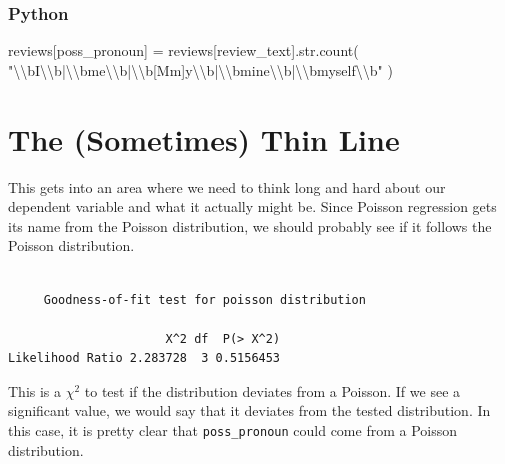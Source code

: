 \documentclass[
  letterpaper,
]{krantz}
\newenvironment{Shaded}{}{}
\newcommand{\BuiltInTok}[1]{\textcolor[rgb]{0.00,0.50,0.00}{#1}}
\newcommand{\CharTok}[1]{\textcolor[rgb]{0.25,0.44,0.63}{#1}}
\newcommand{\NormalTok}[1]{#1}
\newcommand{\OperatorTok}[1]{\textcolor[rgb]{0.40,0.40,0.40}{#1}}
\newcommand{\StringTok}[1]{\textcolor[rgb]{0.25,0.44,0.63}{#1}}
\begin{document}
\subsubsection{Python}

\begin{Shaded}
\begin{Highlighting}[]
\NormalTok{reviews[}\StringTok{\textquotesingle{}poss\_pronoun\textquotesingle{}}\NormalTok{] }\OperatorTok{=}\NormalTok{ reviews[}\StringTok{\textquotesingle{}review\_text\textquotesingle{}}\NormalTok{].}\BuiltInTok{str}\NormalTok{.count(}
  \StringTok{\textquotesingle{}"}\CharTok{\textbackslash{}\textbackslash{}}\StringTok{bI}\CharTok{\textbackslash{}\textbackslash{}}\StringTok{b|}\CharTok{\textbackslash{}\textbackslash{}}\StringTok{bme}\CharTok{\textbackslash{}\textbackslash{}}\StringTok{b|}\CharTok{\textbackslash{}\textbackslash{}}\StringTok{b[Mm]y}\CharTok{\textbackslash{}\textbackslash{}}\StringTok{b|}\CharTok{\textbackslash{}\textbackslash{}}\StringTok{bmine}\CharTok{\textbackslash{}\textbackslash{}}\StringTok{b|}\CharTok{\textbackslash{}\textbackslash{}}\StringTok{bmyself}\CharTok{\textbackslash{}\textbackslash{}}\StringTok{b"\textquotesingle{}}
\NormalTok{  )}
\end{Highlighting}
\end{Shaded}

\section{The (Sometimes) Thin Line}\label{the-sometimes-thin-line}

This gets into an area where we need to think long and hard about our
dependent variable and what it actually might be. Since Poisson
regression gets its name from the Poisson distribution, we should
probably see if it follows the Poisson distribution.

\begin{verbatim}

     Goodness-of-fit test for poisson distribution

                      X^2 df  P(> X^2)
Likelihood Ratio 2.283728  3 0.5156453
\end{verbatim}

This is a \(\chi^2\) to test if the distribution deviates from a
Poisson. If we see a significant value, we would say that it deviates
from the tested distribution. In this case, it is pretty clear that
\texttt{poss\_pronoun} could come from a Poisson distribution.
\end{document}
